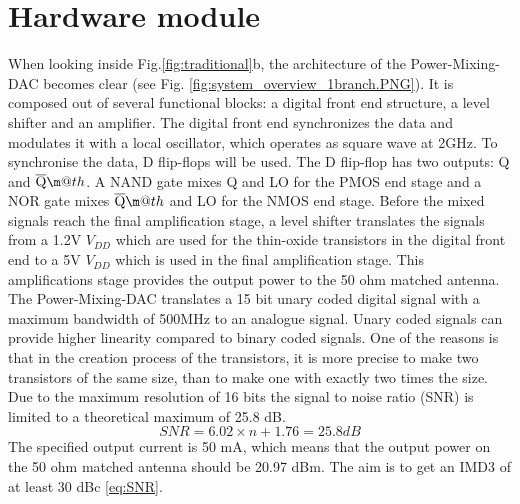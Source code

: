 \makeatletter
\newcommand*{\textoverline}[1]{$\overline{\hbox{#1}}\m@th$}
\makeatother

\section{Hardware module}\label{sec:overview}
When looking inside Fig.\ref{fig:traditional}b, the architecture of the Power-Mixing-DAC becomes clear (see Fig. \ref{fig:system_overview_1branch.PNG}). It is composed out of several functional blocks: a digital front end structure, a level shifter and an amplifier. 
The digital front end synchronizes the data and modulates it with a local oscillator, which operates as square wave at 2GHz. To synchronise the data, D flip-flops will be used. The D flip-flop has two outputs: Q and \textoverline{Q}. A NAND gate mixes Q and LO for the PMOS end stage and a NOR gate mixes \textoverline{Q} and LO for the NMOS end stage. Before the mixed signals reach the final amplification stage, a level shifter translates the signals from a 1.2V $V_{DD}$ which are used for the thin-oxide transistors in the digital front end to a 5V $V_{DD}$ which is used in the final amplification stage. This amplifications stage provides the output power to the 50 ohm matched antenna.
The Power-Mixing-DAC translates a 15 bit unary coded digital signal with a maximum bandwidth of 500MHz to an analogue signal. Unary coded  signals can provide higher linearity compared to binary coded signals. One of the reasons is that in the creation process of the transistors, it is more precise to make two transistors of the same size, than to make one with exactly two times the size. Due to the maximum resolution of 16 bits the signal to noise ratio (SNR) is limited to a theoretical maximum of 25.8 dB.
\begin{equation}\label{eq:SNR}{SNR = 6.02 \times n + 1.76 = 25.8 dB}\end{equation}
The specified output current is 50 mA, which means that the output power on the 50 ohm matched antenna should be 20.97 dBm. The aim is to get an IMD3 of at least 30 dBc \ref{eq:SNR}.
